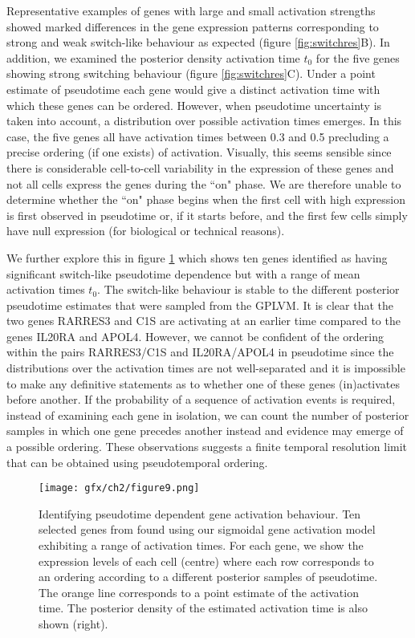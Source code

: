 Representative examples of genes with large and small activation strengths showed marked differences in the gene expression patterns corresponding  to strong and weak switch-like behaviour as expected (figure \ref{fig:switchres}B). In addition, we examined the posterior density activation time $t_0$ for the five genes showing strong switching behaviour (figure \ref{fig:switchres}C). Under a point estimate of pseudotime each gene would give a distinct activation time with which these genes can be ordered. However, when pseudotime uncertainty is taken into account, a distribution over possible activation times emerges. In this case, the five genes all have activation times between 0.3 and 0.5 precluding a precise ordering (if one exists) of activation. Visually, this seems sensible since there is considerable cell-to-cell variability in the expression of these genes and not all cells express the genes during the ``on" phase. We are therefore unable to determine whether the ``on" phase begins when the first cell with high expression is first observed in pseudotime or, if it starts before, and the first few cells simply have null expression (for biological or technical reasons).

We further explore this in figure \ref{fig:switchres2} which shows ten genes identified as having significant switch-like pseudotime dependence but with a range of mean activation times $t_0$. The switch-like behaviour is stable to the different posterior pseudotime estimates that were sampled from the GPLVM. It is clear that the two genes RARRES3 and C1S are activating at an earlier time compared to the genes IL20RA and APOL4. However, we cannot be confident of the ordering within the pairs RARRES3/C1S and IL20RA/APOL4 in pseudotime since the distributions over the activation times are not well-separated and it is impossible to make any definitive statements as to whether one of these genes (in)activates before another. If the probability of a sequence of activation events is required, instead of examining each gene in isolation, we can count the number of posterior samples in which one gene precedes another instead and evidence may emerge of a possible ordering. These observations suggests a finite temporal resolution limit that can be obtained using pseudotemporal ordering.

\begin{figure}%
\centering
	\texttt{[image: gfx/ch2/figure9.png]}
\caption{ Identifying pseudotime dependent gene activation behaviour. Ten selected genes from \cite{Trapnell2014-xi} found using our  sigmoidal gene activation model exhibiting a range of activation times. For each gene, we show the expression levels of each cell (centre) where each row corresponds to an ordering according to a different posterior samples of pseudotime. The orange line corresponds to a point estimate of the activation time. The posterior density of the estimated activation time is also shown (right).
} \label{fig:switchres2}
\end{figure}

